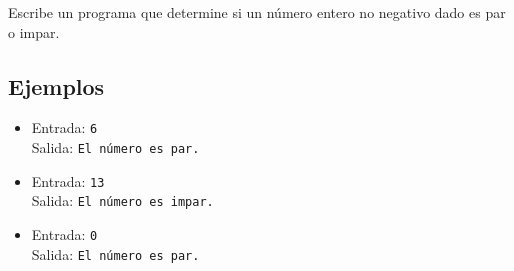 Escribe un programa que determine si un número entero no negativo dado es par o impar.
\subsection*{Ejemplos}
\begin{itemize}
    \item Entrada: \texttt{6}\\
          Salida: \texttt{El número es par.}
    \item Entrada: \texttt{13}\\
          Salida: \texttt{El número es impar.}
    \item Entrada: \texttt{0}\\
          Salida: \texttt{El número es par.}
\end{itemize}